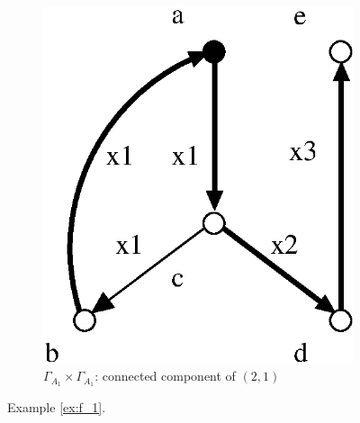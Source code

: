 \documentclass[a4paper,12pt]{article}
\newcommand{\G}{\Gamma }
\numberwithin{equation}{section}
\numberwithin{figure}{section}
\begin{document}
\begin{figure}
\begin{center}
\begin{subfigure}[b]{.25\columnwidth}
\includegraphics[scale=.52]{GxG-2.eps}
\caption{$\G_{A_1}\times \G_{A_1}$: connected component of $(2,1)$}
\label{fig:GxG-2}
\end{subfigure}
\end{center}
\caption{Example \ref{ex:f_1}.}\label{fig:stall}
\end{figure}
\end{document}
